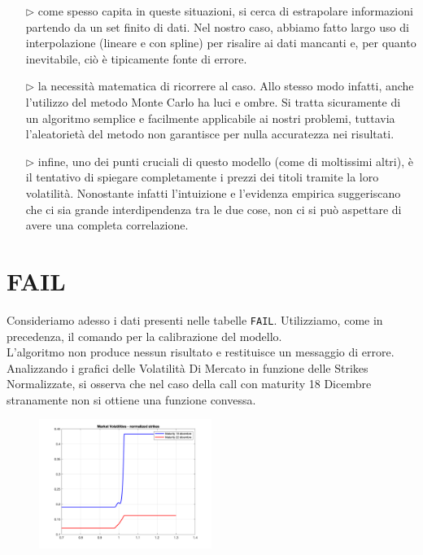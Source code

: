 \documentclass[11pt]{article}
\begin{document}
\begin{itemize}
	\item[$\rhd$] come spesso capita in queste situazioni, si cerca di estrapolare informazioni partendo da un set finito di dati. Nel nostro caso, abbiamo fatto largo uso di interpolazione (lineare e con spline) per risalire ai dati mancanti e, per quanto inevitabile, ciò è tipicamente fonte di errore.
	\item[$\rhd$] la necessità matematica di ricorrere al caso. Allo stesso modo infatti, anche l'utilizzo del metodo Monte Carlo ha luci e ombre. Si tratta sicuramente di un algoritmo semplice e facilmente applicabile ai nostri problemi, tuttavia l'aleatorietà del metodo non garantisce per nulla accuratezza nei risultati.
	\item[$\rhd$] infine, uno dei punti cruciali di questo modello (come di moltissimi altri), è il tentativo di spiegare completamente i prezzi dei titoli tramite la loro volatilità. Nonostante infatti l'intuizione e l'evidenza empirica suggeriscano che ci sia grande interdipendenza tra le due cose, non ci si può aspettare di avere una completa correlazione.
\end{itemize}



\section{FAIL}
Consideriamo adesso i dati presenti nelle tabelle \texttt{FAIL}. Utilizziamo, come in precedenza, il comando per la calibrazione del modello.\\ L'algoritmo non produce nessun risultato e restituisce un messaggio di errore.
Analizzando i grafici delle Volatilità Di Mercato in funzione delle Strikes Normalizzate, si osserva che nel caso della call con maturity 18 Dicembre stranamente non si ottiene una funzione convessa. 

\begin{figure}[H]
\centering
\includegraphics[width=0.5\textwidth]{MktVol_Knorm}
\end{figure}
\end{document}
